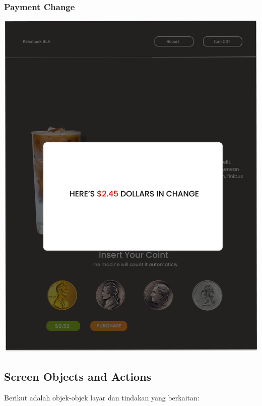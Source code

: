 \documentclass[12pt]{article}
\begin{document}
\subsubsection{Payment Change}
\includegraphics[width=1\linewidth]{./img/Payment-2.png}

\subsection{Screen Objects and Actions}
Berikut adalah objek-objek layar dan tindakan yang berkaitan:
\end{document}
